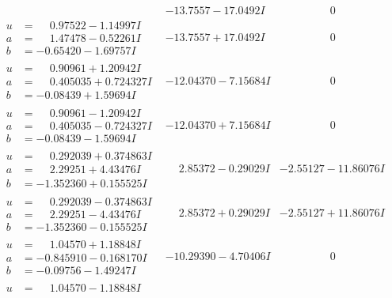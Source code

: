 \documentclass[1p]{elsarticle_modified}
\theoremstyle{definition}
\begin{document}
$$\begin{array}{c|c|c}
 & -13.7557 - 17.0492 I & \phantom{-0.000000 } 0 \\ \hline\begin{aligned}
u &= \phantom{-}0.97522 - 1.14997 I \\
a &= \phantom{-}1.47478 - 0.52261 I \\
b &= -0.65420 - 1.69757 I\end{aligned}
 & -13.7557 + 17.0492 I & \phantom{-0.000000 } 0 \\ \hline\begin{aligned}
u &= \phantom{-}0.90961 + 1.20942 I \\
a &= \phantom{-}0.405035 + 0.724327 I \\
b &= -0.08439 + 1.59694 I\end{aligned}
 & -12.04370 - 7.15684 I & \phantom{-0.000000 } 0 \\ \hline\begin{aligned}
u &= \phantom{-}0.90961 - 1.20942 I \\
a &= \phantom{-}0.405035 - 0.724327 I \\
b &= -0.08439 - 1.59694 I\end{aligned}
 & -12.04370 + 7.15684 I & \phantom{-0.000000 } 0 \\ \hline\begin{aligned}
u &= \phantom{-}0.292039 + 0.374863 I \\
a &= \phantom{-}2.29251 + 4.43476 I \\
b &= -1.352360 + 0.155525 I\end{aligned}
 & \phantom{-}2.85372 - 0.29029 I & -2.55127 - 11.86076 I \\ \hline\begin{aligned}
u &= \phantom{-}0.292039 - 0.374863 I \\
a &= \phantom{-}2.29251 - 4.43476 I \\
b &= -1.352360 - 0.155525 I\end{aligned}
 & \phantom{-}2.85372 + 0.29029 I & -2.55127 + 11.86076 I \\ \hline\begin{aligned}
u &= \phantom{-}1.04570 + 1.18848 I \\
a &= -0.845910 - 0.168170 I \\
b &= -0.09756 - 1.49247 I\end{aligned}
 & -10.29390 - 4.70406 I & \phantom{-0.000000 } 0 \\ \hline\begin{aligned}
u &= \phantom{-}1.04570 - 1.18848 I \\

\end{aligned}
\end{array}$$
\end{document}
